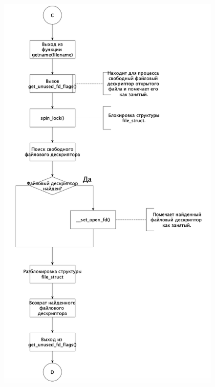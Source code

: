 \documentclass[a4paper,12pt]{article}
\begin{document}
	\begin{figure}[h!]
		\begin{center}
			{\includegraphics[scale = 0.8]{3.png}}
			\label{3}
		\end{center}
	\end{figure}
\end{document}

